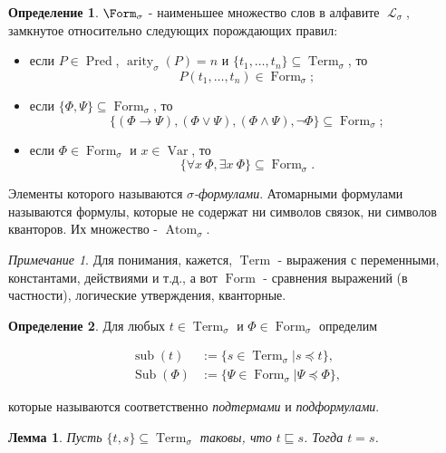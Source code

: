 \documentclass[a4paper,100pt]{article}
\theoremstyle{indented}
\newtheorem{lemma}{Лемма}
\theoremstyle{definition}
\newtheorem{defn}{Определение}
\theoremstyle{remark}
\newtheorem{remark}{Примечание}
\DeclareMathOperator{\ra}{\rightarrow}
\DeclareMathOperator{\LL}{\mathscr{L}}
\DeclareMathOperator{\form}{Form}
\DeclareMathOperator{\Pred}{Pred}
\DeclareMathOperator{\arity}{arity}
\DeclareMathOperator{\Var}{Var}
\DeclareMathOperator{\Term}{Term}
\DeclareMathOperator{\sub}{sub}
\DeclareMathOperator{\Sub}{Sub}
\DeclareMathOperator{\Atom}{Atom}
\begin{document}
\begin{defn}
  $\Form_\sigma$ - наименьшее множество слов в алфавите $\LL_\sigma$, замкнутое относительно следующих порождающих правил:

  \begin{itemize}
    \item если $P\in \Pred$, $\arity_\sigma(P)=n$ и $\{t_1, \ldots, t_n\}\subseteq \Term_\sigma$, то 
    \[
      P(t_1, \ldots, t_n)\in \form_\sigma; 
    \]
    \item если $\{\Phi, \Psi\}\subseteq \form_\sigma$, то 
    \[
      \{(\Phi\ra \Psi), (\Phi\vee \Psi), (\Phi\wedge \Psi), \neg \Phi \} \subseteq \form_\sigma; 
    \]
    \item если $\Phi \in \form_\sigma$ и $x \in \Var$, то
    \[
      \{\forall x \: \Phi, \exists x \: \Phi\} \subseteq \form_\sigma.
    \]
  \end{itemize}

  Элементы которого называются \textit{$\sigma$-формулами}. Атомарными формулами называются формулы, которые не содержат ни символов связок, ни символов кванторов. Их множество - $\Atom_\sigma$. 
\end{defn}

\begin{remark}
  Для понимания, кажется, $\Term$ - выражения с переменными, константами, действиями и т.д., а вот $\form$ - сравнения выражений (в частности), логические утверждения, кванторные.
\end{remark}

\begin{defn}
  Для любых $t\in \Term_\sigma$ и $\Phi\in \form_\sigma$ определим 

  \begin{equation*}
    \begin{aligned}
      \sub(t) & := \{s \in \Term_\sigma | s\preccurlyeq t\}, \\
      \Sub(\Phi) & := \{\Psi \in \form_\sigma | \Psi\preccurlyeq \Phi\}, 
    \end{aligned}
  \end{equation*}

  которые называются соответственно \textit{подтермами} и \textit{подформулами}.
\end{defn}

\begin{lemma}
  Пусть $\{t, s\}\subseteq \Term_\sigma$ таковы, что $t\sqsubseteq s$. Тогда $t=s$. 
\end{lemma} \
\end{document}

